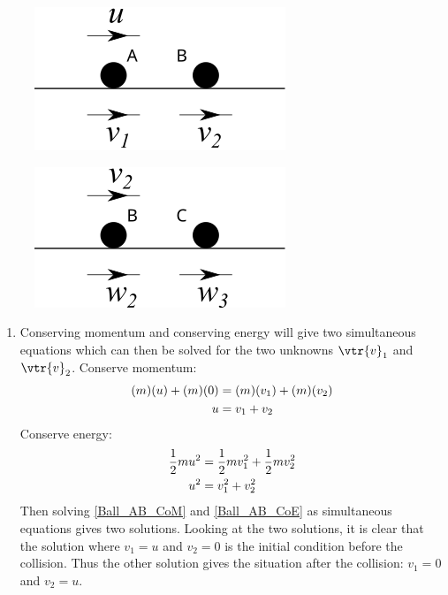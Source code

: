 \begin{problem}[A1969AMIIQ8l]
{\begin{figure}[h]
  \centering
 	\includegraphics[width=0.5\linewidth]{../../../figures/Dynamics_ball_collision_AB}
	\caption{}
	\label{fig:Dynamics_ball_collision_AB}
\end{figure}
\begin{figure}[h]
	\centering
	\includegraphics[width=0.5\linewidth]{../../../figures/Dynamics_ball_collision_BC}
	\caption{}
	\label{fig:Dynamics_ball_collision_BC}
\caption{}
\end{figure}

\begin{enumerate}
	\item Conserving momentum and conserving energy will give two simultaneous equations which can then be solved for the two unknowns $\vtr{v}_{1}$ and $\vtr{v}_{2}$.
Conserve momentum:
\begin{align} \notag (m)(u) + (m)(0) &= (m)(v_{1}) + (m)(v_{2}) \\ u &= v_{1} + v_{2} \label{Ball_AB_CoM}\end{align}
Conserve energy:
\begin{align} \notag \frac{1}{2}mu^{2} &= \frac{1}{2}mv_{1}^{2} + \frac{1}{2}mv_{2}^{2} \\ u^{2} &= v_{1}^{2} + v_{2}^{2} \label{Ball_AB_CoE}\end{align}
Then solving \ref{Ball_AB_CoM} and \ref{Ball_AB_CoE} as simultaneous equations gives two solutions. Looking at the two solutions, it is clear that the solution where $v_{1} = u$ and $v_{2} = 0$ is the initial condition before the collision. Thus the other solution gives the situation after the collision: $v_{1} = 0$ and $v_{2} = u$.


\end{enumerate}}
\end{problem}
